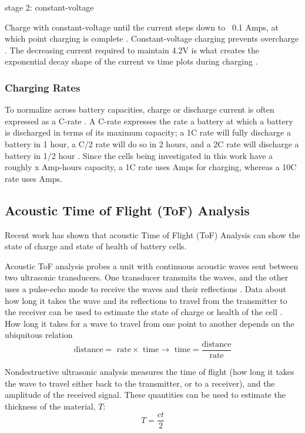 stage 2: constant-voltage 

Charge with constant-voltage until the current steps down to ~0.1 Amps, at which point charging is complete \cite{DIGIKEY}. Constant-voltage charging prevents overcharge \cite{DIGIKEY}. The decreasing current required to maintain 4.2V is what creates the exponential decay shape of the current vs time plots during charging \cite{TI}.

\subsubsection{Charging Rates}
To normalize across battery capacities, charge or discharge current is often expressed as a C-rate \cite{SPECS}. 
A C-rate expresses the rate a battery at which a battery is discharged in terms of its maximum capacity; a 1C rate will fully discharge a battery in 1 hour, a C/2 rate will do so in 2 hours, and a 2C rate will discharge a battery in 1/2 hour \cite{SPECS}. 
Since the cells being investigated in this work have a roughly x Amp-hours  capacity, a 1C rate uses  Amps for charging, whereas a 10C rate uses  Amps.

\subsection{Acoustic Time of Flight (ToF) Analysis}
Recent work has shown that acoustic Time of Flight (ToF) Analysis can show the state of charge and state of health of battery cells.

Acoustic ToF analysis probes a unit with continuous acoustic waves sent between two ultrasonic transducers. One transducer transmits the waves, and the other uses a pulse-echo mode to receive the waves and their reflections \cite{TOF-STATE}. Data about how long it takes the wave and its reflections to travel from the transmitter to the receiver can be used to estimate the state of charge or health of the cell \cite{TOF-STATE}. 
How long it takes for a wave to travel from one point to another depends on the ubiquitous relation 
$$\text{distance} = \text{ rate} \times \text{ time} \rightarrow \text{ time} = \frac{\text{distance}}{\text{rate}}$$

Nondestructive ultrasonic analysis measures the time of flight (how long it takes the wave to travel either back to the transmitter, or to a receiver), and the amplitude of the received signal. 
These quantities can be used to estimate the thickness of the material, $T$:
$$ T = \frac{ct}{2}$$

